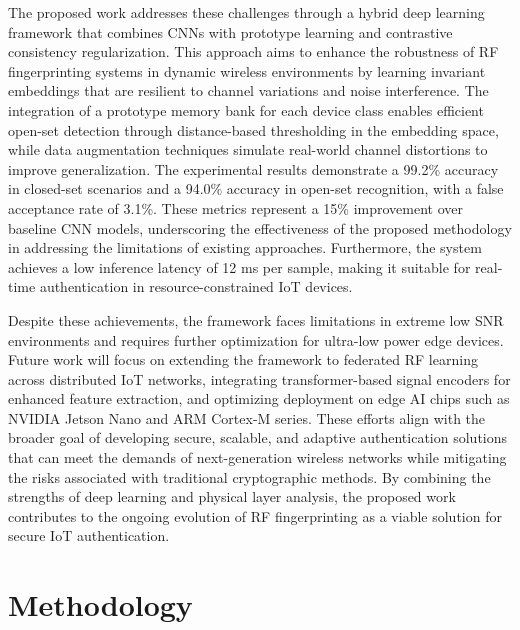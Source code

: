 \documentclass[conference]{IEEEtran}
\begin{document}
The proposed work addresses these challenges through a hybrid deep learning framework that combines CNNs with prototype learning and contrastive consistency regularization. This approach aims to enhance the robustness of RF fingerprinting systems in dynamic wireless environments by learning invariant embeddings that are resilient to channel variations and noise interference. The integration of a prototype memory bank for each device class enables efficient open-set detection through distance-based thresholding in the embedding space, while data augmentation techniques simulate real-world channel distortions to improve generalization. The experimental results demonstrate a 99.2\% accuracy in closed-set scenarios and a 94.0\% accuracy in open-set recognition, with a false acceptance rate of 3.1\%. These metrics represent a 15\% improvement over baseline CNN models, underscoring the effectiveness of the proposed methodology in addressing the limitations of existing approaches. Furthermore, the system achieves a low inference latency of 12 ms per sample, making it suitable for real-time authentication in resource-constrained IoT devices.

Despite these achievements, the framework faces limitations in extreme low SNR environments and requires further optimization for ultra-low power edge devices. Future work will focus on extending the framework to federated RF learning across distributed IoT networks, integrating transformer-based signal encoders for enhanced feature extraction, and optimizing deployment on edge AI chips such as NVIDIA Jetson Nano and ARM Cortex-M series. These efforts align with the broader goal of developing secure, scalable, and adaptive authentication solutions that can meet the demands of next-generation wireless networks while mitigating the risks associated with traditional cryptographic methods. By combining the strengths of deep learning and physical layer analysis, the proposed work contributes to the ongoing evolution of RF fingerprinting as a viable solution for secure IoT authentication.

\section{Methodology}
\end{document}
